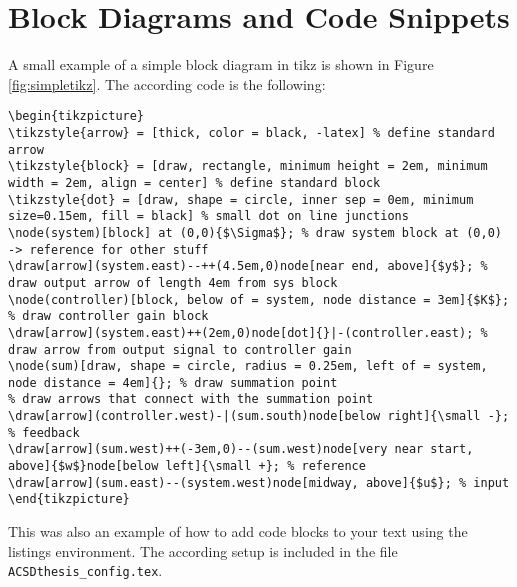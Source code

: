 \section{Block Diagrams and Code Snippets}
A small example of a simple block diagram in tikz is shown in Figure \ref{fig:simpletikz}. The according code is the following: 
\lstset{language=TeX} %
\begin{lstlisting}
\begin{tikzpicture}
\tikzstyle{arrow} = [thick, color = black, -latex] % define standard arrow
\tikzstyle{block} = [draw, rectangle, minimum height = 2em, minimum width = 2em, align = center] % define standard block
\tikzstyle{dot} = [draw, shape = circle, inner sep = 0em, minimum size=0.15em, fill = black] % small dot on line junctions
\node(system)[block] at (0,0){$\Sigma$}; % draw system block at (0,0) -> reference for other stuff
\draw[arrow](system.east)--++(4.5em,0)node[near end, above]{$y$}; % draw output arrow of length 4em from sys block
\node(controller)[block, below of = system, node distance = 3em]{$K$}; % draw controller gain block
\draw[arrow](system.east)++(2em,0)node[dot]{}|-(controller.east); % draw arrow from output signal to controller gain
\node(sum)[draw, shape = circle, radius = 0.25em, left of = system, node distance = 4em]{}; % draw summation point
% draw arrows that connect with the summation point
\draw[arrow](controller.west)-|(sum.south)node[below right]{\small -}; % feedback
\draw[arrow](sum.west)++(-3em,0)--(sum.west)node[very near start, above]{$w$}node[below left]{\small +}; % reference
\draw[arrow](sum.east)--(system.west)node[midway, above]{$u$}; % input
\end{tikzpicture}
\end{lstlisting}

This was also an example of how to add code blocks to your text using the listings environment. The according setup is included in the file \texttt{ACSDthesis\_config.tex}. 


